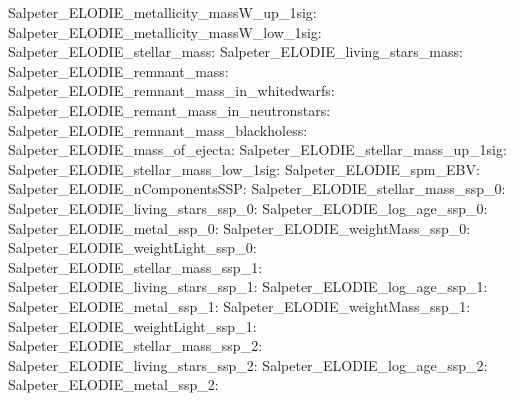 Salpeter\_ELODIE\_metallicity\_massW\_up\_1sig:  \newline 
Salpeter\_ELODIE\_metallicity\_massW\_low\_1sig:  \newline 
Salpeter\_ELODIE\_stellar\_mass:  \newline 
Salpeter\_ELODIE\_living\_stars\_mass:  \newline 
Salpeter\_ELODIE\_remnant\_mass:  \newline 
Salpeter\_ELODIE\_remnant\_mass\_in\_whitedwarfs:  \newline 
Salpeter\_ELODIE\_remant\_mass\_in\_neutronstars:  \newline 
Salpeter\_ELODIE\_remnant\_mass\_blackholess:  \newline 
Salpeter\_ELODIE\_mass\_of\_ejecta:  \newline 
Salpeter\_ELODIE\_stellar\_mass\_up\_1sig:  \newline 
Salpeter\_ELODIE\_stellar\_mass\_low\_1sig:  \newline 
Salpeter\_ELODIE\_spm\_EBV:  \newline 
Salpeter\_ELODIE\_nComponentsSSP:  \newline 
Salpeter\_ELODIE\_stellar\_mass\_ssp\_0:  \newline 
Salpeter\_ELODIE\_living\_stars\_ssp\_0:  \newline 
Salpeter\_ELODIE\_log\_age\_ssp\_0:  \newline 
Salpeter\_ELODIE\_metal\_ssp\_0:  \newline 
Salpeter\_ELODIE\_weightMass\_ssp\_0:  \newline 
Salpeter\_ELODIE\_weightLight\_ssp\_0:  \newline 
Salpeter\_ELODIE\_stellar\_mass\_ssp\_1:  \newline 
Salpeter\_ELODIE\_living\_stars\_ssp\_1:  \newline 
Salpeter\_ELODIE\_log\_age\_ssp\_1:  \newline 
Salpeter\_ELODIE\_metal\_ssp\_1:  \newline 
Salpeter\_ELODIE\_weightMass\_ssp\_1:  \newline 
Salpeter\_ELODIE\_weightLight\_ssp\_1:  \newline 
Salpeter\_ELODIE\_stellar\_mass\_ssp\_2:  \newline 
Salpeter\_ELODIE\_living\_stars\_ssp\_2:  \newline 
Salpeter\_ELODIE\_log\_age\_ssp\_2:  \newline 
Salpeter\_ELODIE\_metal\_ssp\_2:  \newline 
